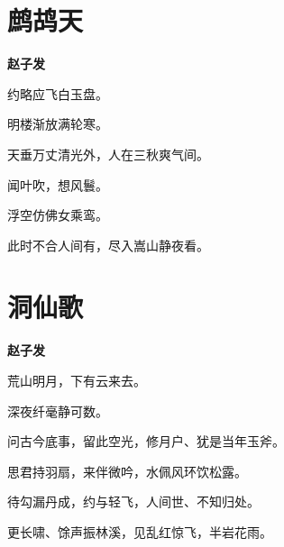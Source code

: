 \documentclass[12pt,a4paper]{ctexbook}
\begin{document}
\section{鹧鸪天}
\textbf{赵子发}\par\vspace{0.5em}
约略应飞白玉盘。\par
明楼渐放满轮寒。\par
天垂万丈清光外，人在三秋爽气间。\par
闻叶吹，想风鬟。\par
浮空仿佛女乘鸾。\par
此时不合人间有，尽入嵩山静夜看。\par

\section{洞仙歌}
\textbf{赵子发}\par\vspace{0.5em}
荒山明月，下有云来去。\par
深夜纤毫静可数。\par
问古今底事，留此空光，修月户、犹是当年玉斧。\par
思君持羽扇，来伴微吟，水佩风环饮松露。\par
待勾漏丹成，约与轻飞，人间世、不知归处。\par
更长啸、馀声振林溪，见乱红惊飞，半岩花雨。\par
\end{document}
